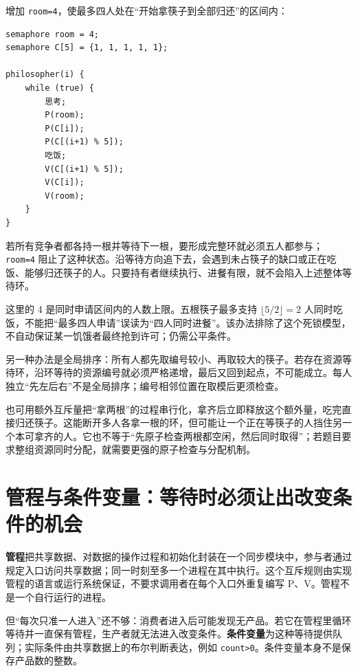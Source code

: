 增加 \allowbreak{}\texttt{room=4}，使最多四人处在``开始拿筷子到全部归还''的区间内：

\par\medskip\noindent
\begin{minipage}{\linewidth}
\begin{verbatim}
semaphore room = 4;
semaphore C[5] = {1, 1, 1, 1, 1};

philosopher(i) {
    while (true) {
        思考;
        P(room);
        P(C[i]);
        P(C[(i+1) % 5]);
        吃饭;
        V(C[(i+1) % 5]);
        V(C[i]);
        V(room);
    }
}
\end{verbatim}
\end{minipage}\par\medskip

若所有竞争者都各持一根并等待下一根，要形成完整环就必须五人都参与；\allowbreak{}\texttt{room=4} 阻止了这种状态。沿等待方向追下去，会遇到未占筷子的缺口或正在吃饭、能够归还筷子的人。只要持有者继续执行、进餐有限，就不会陷入上述整体等待环。

这里的 4 是同时申请区间内的人数上限。五根筷子最多支持 \(\lfloor5/2\rfloor=2\) 人同时吃饭，不能把``最多四人申请''误读为``四人同时进餐''。该办法排除了这个死锁模型，不自动保证某一饥饿者最终抢到许可；仍需公平条件。

另一种办法是全局排序：所有人都先取编号较小、再取较大的筷子。若存在资源等待环，沿环等待的资源编号就必须严格递增，最后又回到起点，不可能成立。每人独立``先左后右''不是全局排序；编号相邻位置在取模后更须检查。

也可用额外互斥量把``拿两根''的过程串行化，拿齐后立即释放这个额外量，吃完直接归还筷子。这能断开多人各拿一根的环，但可能让一个正在等筷子的人挡住另一个本可拿齐的人。它也不等于``先原子检查两根都空闲，然后同时取得''；若题目要求整组资源同时分配，就需要更强的原子检查与分配机制。

\section{管程与条件变量：等待时必须让出改变条件的机会}\label{sec-monitor}

\textbf{管程}把共享数据、对数据的操作过程和初始化封装在一个同步模块中，参与者通过规定入口访问共享数据；同一时刻至多一个进程在其中执行。这个互斥规则由实现管程的语言或运行系统保证，不要求调用者在每个入口外重复编写 P、V。管程不是一个自行运行的进程。

但``每次只准一人进入''还不够：消费者进入后可能发现无产品。若它在管程里循环等待并一直保有管程，生产者就无法进入改变条件。\textbf{条件变量}为这种等待提供队列；实际条件由共享数据上的布尔判断表达，例如 \allowbreak{}\texttt{count\textgreater{}0}。条件变量本身不是保存产品数的整数。

